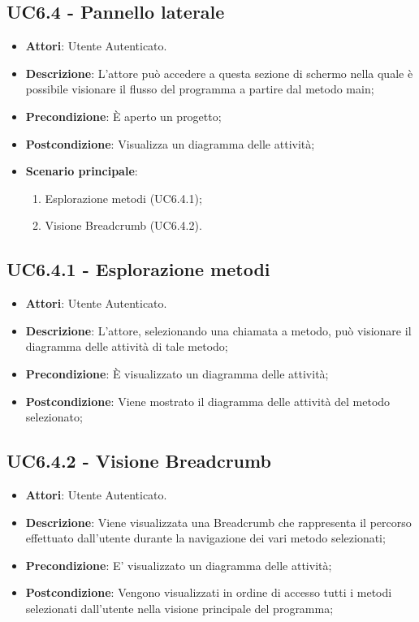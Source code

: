 \subsection{UC6.4 - Pannello laterale} 
\label{ssec:UC6.4} 
\begin{itemize} 
\item \textbf{Attori}: Utente Autenticato.
\item \textbf{Descrizione}: L'attore può accedere a questa sezione di schermo nella quale è possibile visionare il flusso del programma a partire dal metodo main;
\item \textbf{Precondizione}: È aperto un progetto;
\item \textbf{Postcondizione}: Visualizza un diagramma delle attività;
\item \textbf{Scenario principale}: \begin{enumerate}\item Esplorazione metodi (UC6.4.1);\item Visione Breadcrumb (UC6.4.2). 
 \end{enumerate}
\end{itemize} 
\subsection{UC6.4.1 - Esplorazione metodi} 
\label{ssec:UC6.4.1} 
\begin{itemize} 
\item \textbf{Attori}: Utente Autenticato.
\item \textbf{Descrizione}: L'attore, selezionando una chiamata a metodo, può visionare il diagramma delle attività di tale metodo;
\item \textbf{Precondizione}: È visualizzato un diagramma delle attività;
\item \textbf{Postcondizione}: Viene mostrato il diagramma delle attività del metodo selezionato;
\end{itemize} 
\subsection{UC6.4.2 - Visione Breadcrumb} 
\label{ssec:UC6.4.2} 
\begin{itemize} 
\item \textbf{Attori}: Utente Autenticato.
\item \textbf{Descrizione}: Viene visualizzata una Breadcrumb che rappresenta il percorso effettuato dall'utente durante la navigazione dei vari metodo selezionati;
\item \textbf{Precondizione}: E' visualizzato un diagramma delle attività;
\item \textbf{Postcondizione}: Vengono visualizzati in ordine di accesso tutti i metodi selezionati dall'utente nella visione principale del programma;
\end{itemize} 
